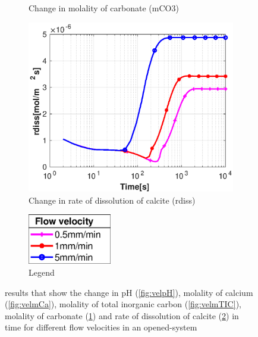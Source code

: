 \begin{figure}[!h]
\begin{subfigure}{.5\linewidth}
        \caption{Change in molality of carbonate (mCO3)}
        \label{fig:velmCO3}
    \end{subfigure}%
    \hfill
    \begin{subfigure}{.5\linewidth}
        \centering
        \includegraphics[width=\textwidth]{PICTURES/with_vel_rdiss.eps}
        \caption{Change in rate of dissolution of calcite (rdiss)}
        \label{fig:velrdiss}
    \end{subfigure}%
    \begin{subfigure}{.5\linewidth}
        \centering
        \includegraphics[width=0.40\textwidth]{PICTURES/with_vel_legend.eps}
        \caption{Legend}
        \label{fig:vellegend}
    \end{subfigure}%
    \hfill
     \caption{\DuMuX results that show the change in pH (\cref{fig:velpH}), molality of calcium (\cref{fig:velmCa}), 
     molality of total inorganic carbon (\cref{fig:velmTIC}), molality of carbonate (\cref{fig:velmCO3}) and rate of 
     dissolution of calcite (\cref{fig:velrdiss}) in time for different flow velocities in an opened-system}
     \label{fig:comparisionDiffFlowVelocity}
\end{figure}


